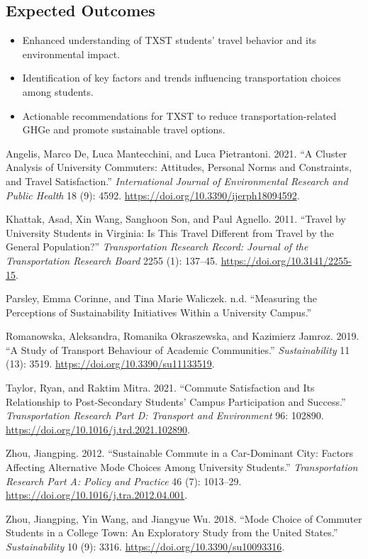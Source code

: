 \documentclass[
  letterpaper,
  DIV=11,
  numbers=noendperiod]{scrartcl}
\newlength{\cslhangindent}
\newenvironment{CSLReferences}[2] %
 {\begin{list}{}{%
  \setlength{\itemindent}{0pt}
  \setlength{\leftmargin}{0pt}
  \setlength{\parsep}{0pt}
  \ifodd #1
   \setlength{\leftmargin}{\cslhangindent}
   \setlength{\itemindent}{-1\cslhangindent}
  \fi
  \setlength{\itemsep}{#2\baselineskip}}}
 {\end{list}}
\begin{document}
\subsection{Expected Outcomes}\label{expected-outcomes}

\begin{itemize}
\item
  Enhanced understanding of TXST students' travel behavior and its
  environmental impact.
\item
  Identification of key factors and trends influencing transportation
  choices among students.
\item
  Actionable recommendations for TXST to reduce transportation-related
  GHGe and promote sustainable travel options.
\end{itemize}

\label{refs}
\begin{CSLReferences}{1}{0}
Angelis, Marco De, Luca Mantecchini, and Luca Pietrantoni. 2021. {``A
Cluster Analysis of University Commuters: Attitudes, Personal Norms and
Constraints, and Travel Satisfaction.''} \emph{International Journal of
Environmental Research and Public Health} 18 (9): 4592.
\url{https://doi.org/10.3390/ijerph18094592}.

Khattak, Asad, Xin Wang, Sanghoon Son, and Paul Agnello. 2011. {``Travel
by University Students in Virginia: Is This Travel Different from Travel
by the General Population?''} \emph{Transportation Research Record:
Journal of the Transportation Research Board} 2255 (1): 137--45.
\url{https://doi.org/10.3141/2255-15}.

Parsley, Emma Corinne, and Tina Marie Waliczek. n.d. {``Measuring the
Perceptions of Sustainability Initiatives Within a University Campus.''}

Romanowska, Aleksandra, Romanika Okraszewska, and Kazimierz Jamroz.
2019. {``A Study of Transport Behaviour of Academic Communities.''}
\emph{Sustainability} 11 (13): 3519.
\url{https://doi.org/10.3390/su11133519}.

Taylor, Ryan, and Raktim Mitra. 2021. {``Commute Satisfaction and Its
Relationship to Post-Secondary Students' Campus Participation and
Success.''} \emph{Transportation Research Part D: Transport and
Environment} 96: 102890.
\url{https://doi.org/10.1016/j.trd.2021.102890}.

Zhou, Jiangping. 2012. {``Sustainable Commute in a Car-Dominant City:
Factors Affecting Alternative Mode Choices Among University Students.''}
\emph{Transportation Research Part A: Policy and Practice} 46 (7):
1013--29. \url{https://doi.org/10.1016/j.tra.2012.04.001}.

Zhou, Jiangping, Yin Wang, and Jiangyue Wu. 2018. {``Mode Choice of
Commuter Students in a College Town: An Exploratory Study from the
United States.''} \emph{Sustainability} 10 (9): 3316.
\url{https://doi.org/10.3390/su10093316}.

\end{CSLReferences}
\end{document}
